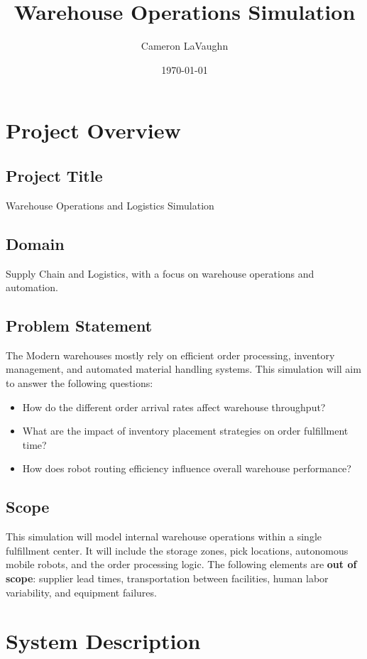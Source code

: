 \documentclass[onecolumn,12pt]{IEEEtran}
\title{Warehouse Operations Simulation}
\author{Cameron LaVaughn}
\date{\today}
\begin{document}
\doublespacing
\maketitle

\section{Project Overview}

\subsection{Project Title}
Warehouse Operations and Logistics Simulation

\subsection{Domain}
Supply Chain and Logistics, with a focus on warehouse operations and automation.

\subsection{Problem Statement}
The Modern warehouses mostly rely on efficient order processing, inventory management, and automated material handling systems. This simulation will  aim to answer the following questions:
\begin{itemize}
    \item How do the different order arrival rates affect warehouse throughput?
    \item What are the impact of inventory placement strategies on order fulfillment time?
    \item How does robot routing efficiency influence overall warehouse performance?
\end{itemize}

\subsection{Scope}
This simulation will model internal warehouse operations within a single fulfillment center. It will include the storage zones, pick locations, autonomous mobile robots, and the order processing logic. The following elements are \textbf{out of scope}: supplier lead times, transportation between facilities, human labor variability, and equipment failures.

\section{System Description}
\end{document}

